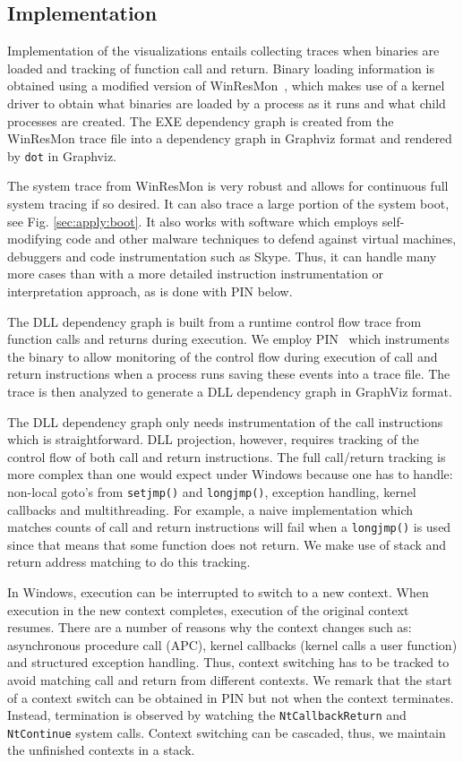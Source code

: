 \subsection{Implementation}

Implementation of the visualizations entails collecting tra\-ces when
binaries are loaded and tracking of function call and return.
Binary loading information is obtained using
a modified version of WinResMon~\cite{ramnath2006winresmon},
which makes use of a kernel driver to obtain
what binaries are loaded by a process as it runs and
what child processes are created.
The EXE dependency graph is created from
the WinResMon trace file into a dependency graph in
Graphviz \cite{ellson2002graphviz} format and rendered by {\tt dot} in Graphviz.

The system trace from WinResMon is very robust and allows for continuous
full system tracing if so desired.
It can also trace a large portion of the system boot,
see Fig. \ref{sec:apply:boot}.
It also works with software which employs self-modifying
code and other malware techniques to defend against virtual machines,
debuggers and code instrumentation such as Skype.
Thus, it can handle many more cases than with a more detailed
instruction instrumentation or interpretation approach, as is done
with PIN below.

The DLL dependency graph is built from a runtime control flow trace from
function calls and returns during execution.
We employ PIN~\cite{luk2005pin} which instruments the binary to allow monitoring
of the control flow during execution of call and return instructions
when a process runs saving these events into a trace file.
The trace is then analyzed to generate a DLL dependency graph in
GraphViz format.

The DLL dependency graph only needs instrumentation of the call instructions
which is straightforward.
DLL projection, however, requires tracking of the control flow of both
call and return instructions.
The full call/return tracking is more complex than one would expect
under Windows because one has to handle:
non-local goto's from {\tt setjmp()} and {\tt longjmp()}, exception handling,
kernel callbacks and multithreading.
For example, a naive implementation which matches counts of call and
return instructions will fail when a {\tt longjmp()} is used
since that means that some function does not return.
We make use of stack and return address matching to do this tracking.

In Windows, execution can be interrupted to switch to a new context.
When execution in the new context completes, execution of the original
context resumes.
There are a number of reasons why the context changes
such as: asynchronous procedure call (APC), kernel callbacks
(kernel calls a user function) and structured exception handling.
Thus, context switching has to be tracked to avoid matching
call and return from different contexts.
We remark that the start of a context switch can be obtained in PIN but
not when the context terminates.
Instead, termination is observed by watching the {\tt NtCallbackReturn}
and {\tt NtContinue} system calls.
Context switching can be cascaded, thus, we maintain the unfinished
contexts in a stack.

